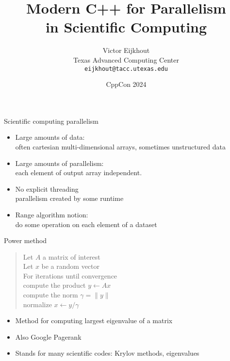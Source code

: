 \documentclass[10pt,t]{beamer}
\begin{document}


\author[Eijkhout]{Victor Eijkhout\\
  Texas Advanced Computing Center\\
  \texttt{eijkhout@tacc.utexas.edu}
}
\date[CppCon2024]{CppCon 2024}
\title[C++ Parallel]{Modern C++ for Parallelism\\ in Scientific Computing}
\maketitle

\begin{frame}{Scientific computing parallelism}
  \begin{itemize}
  \item Large amounts of data: \\
    often cartesian multi-dimensional arrays, sometimes unstructured data
  \item Large amounts of parallelism:\\
    each element of output array independent.
  \item No explicit threading\\
    parallelism created by some runtime
  \item Range algorithm notion:\\
    do some operation on each element of a dataset
  \end{itemize}
\end{frame}

\begin{frame}[containsverbatim]{Power method}
  \hbox{}
  \begin{quote}
    \begin{tabbing}
      Let $A$ a matrix of interest\\
      Let $x$ be a random vector\\
      For \=iterations until convergence\\
      \> compute the product $y\leftarrow Ax$\\
      \> compute the norm $\gamma=\| y \|$\\
      \> normalize $x\leftarrow y/\gamma$\\
    \end{tabbing}
  \end{quote}
  \begin{itemize}
  \item Method for computing largest eigenvalue of a matrix
  \item Also Google Pagerank
  \item Stands for many scientific codes: Krylov methods, eigenvalues
  \end{itemize}
\end{frame}
\end{document}
